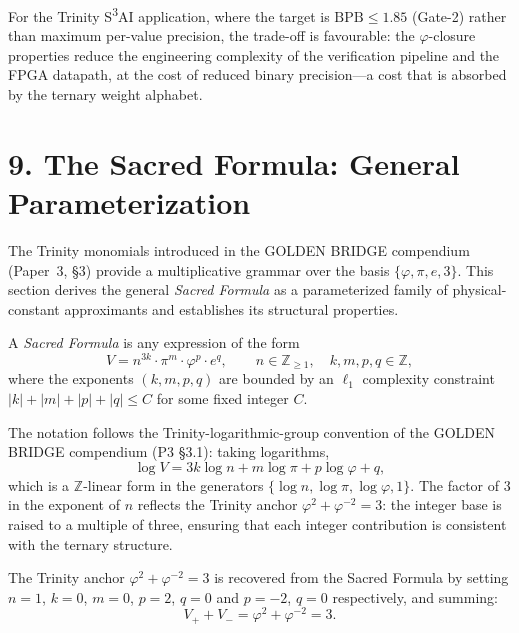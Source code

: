 For the Trinity S\textsuperscript{3}AI application, where the target is
\(\mathrm{BPB} \le 1.85\) (Gate-2) rather than maximum per-value
precision, the trade-off is favourable: the \(\varphi\)-closure
properties reduce the engineering complexity of the verification pipeline
and the FPGA datapath, at the cost of reduced binary precision---a cost
that is absorbed by the ternary weight alphabet.

\section{9. The Sacred Formula: General Parameterization}\label{fa_04:sacred-formula}

The Trinity monomials introduced in the GOLDEN BRIDGE compendium
(Paper~3, \S3) provide a multiplicative grammar over the basis
$\{\varphi, \pi, e, 3\}$. This section derives the general
\emph{Sacred Formula} as a parameterized family of physical-constant
approximants and establishes its structural properties.

\begin{definition}
\label{fa_04:def:sacred-formula}
A \emph{Sacred Formula} is any expression of the form
\[
  V = n^{3k} \cdot \pi^{m} \cdot \varphi^{p} \cdot e^{q},
  \qquad n \in \mathbb{Z}_{\ge 1},\quad k, m, p, q \in \mathbb{Z},
\]
where the exponents $(k, m, p, q)$ are bounded by an $\ell_{1}$
complexity constraint $|k| + |m| + |p| + |q| \le C$ for some fixed
integer $C$.
\end{definition}

The notation follows the Trinity-logarithmic-group convention of the
GOLDEN BRIDGE compendium (P3 \S3.1): taking logarithms,
\[
  \log V = 3k \log n + m \log \pi + p \log \varphi + q,
\]
which is a $\mathbb{Z}$-linear form in the generators
$\{\log n, \log \pi, \log \varphi, 1\}$. The factor of $3$ in the
exponent of $n$ reflects the Trinity anchor
$\varphi^{2} + \varphi^{-2} = 3$: the integer base is raised to a
multiple of three, ensuring that each integer contribution is
consistent with the ternary structure.

\begin{theorem}
\label{fa_04:thm:sacred-anchor}
The Trinity anchor $\varphi^{2} + \varphi^{-2} = 3$ is recovered
from the Sacred Formula by setting $n = 1$, $k = 0$, $m = 0$,
$p = 2$, $q = 0$ and $p = -2$, $q = 0$ respectively, and summing:
\[
  V_{+} + V_{-} = \varphi^{2} + \varphi^{-2} = 3.
\]
\end{theorem}

